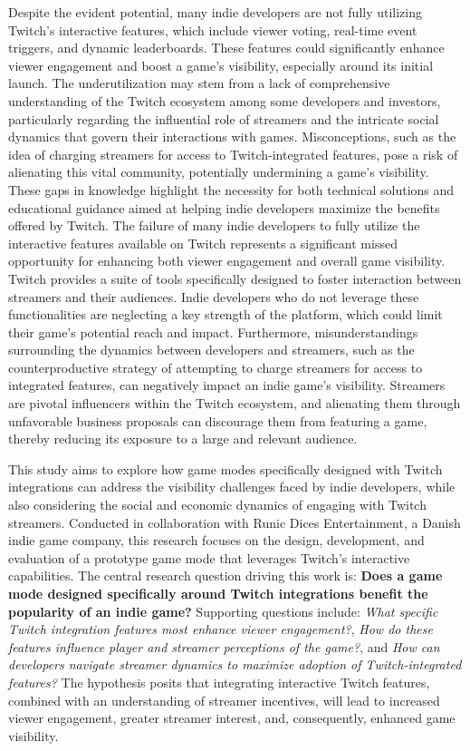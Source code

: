 \documentclass[conference]{IEEEtran}
\begin{document}
Despite the evident potential, many indie developers are not fully utilizing Twitch's interactive features, which include viewer voting, real-time event triggers, and dynamic leaderboards. These features could significantly enhance viewer engagement and boost a game's visibility, especially around its initial launch. The underutilization may stem from a lack of comprehensive understanding of the Twitch ecosystem among some developers and investors, particularly regarding the influential role of streamers and the intricate social dynamics that govern their interactions with games. Misconceptions, such as the idea of charging streamers for access to Twitch-integrated features, pose a risk of alienating this vital community, potentially undermining a game's visibility. These gaps in knowledge highlight the necessity for both technical solutions and educational guidance aimed at helping indie developers maximize the benefits offered by Twitch. The failure of many indie developers to fully utilize the interactive features available on Twitch represents a significant missed opportunity for enhancing both viewer engagement and overall game visibility. Twitch provides a suite of tools specifically designed to foster interaction between streamers and their audiences. Indie developers who do not leverage these functionalities are neglecting a key strength of the platform, which could limit their game's potential reach and impact. Furthermore, misunderstandings surrounding the dynamics between developers and streamers, such as the counterproductive strategy of attempting to charge streamers for access to integrated features, can negatively impact an indie game's visibility. Streamers are pivotal influencers within the Twitch ecosystem, and alienating them through unfavorable business proposals can discourage them from featuring a game, thereby reducing its exposure to a large and relevant audience.

This study aims to explore how game modes specifically designed with Twitch integrations can address the visibility challenges faced by indie developers, while also considering the social and economic dynamics of engaging with Twitch streamers. Conducted in collaboration with Runic Dices Entertainment, a Danish indie game company, this research focuses on the design, development, and evaluation of a prototype game mode that leverages Twitch's interactive capabilities. The central research question driving this work is: \textbf{Does a game mode designed specifically around Twitch integrations benefit the popularity of an indie game?} Supporting questions include: \textit{What specific Twitch integration features most enhance viewer engagement?}, \textit{How do these features influence player and streamer perceptions of the game?}, and \textit{How can developers navigate streamer dynamics to maximize adoption of Twitch-integrated features?} The hypothesis posits that integrating interactive Twitch features, combined with an understanding of streamer incentives, will lead to increased viewer engagement, greater streamer interest, and, consequently, enhanced game visibility.
\end{document}
